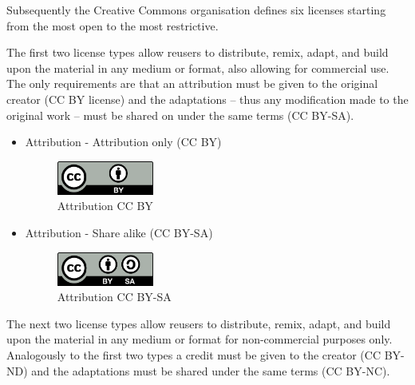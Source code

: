 Subsequently the Creative Commons organisation defines six licenses starting from the most open to the most restrictive.

The first two license types allow reusers to distribute, remix, adapt, and build upon the material in any medium or format, also allowing for commercial use. The only requirements are that an attribution must be given to the original creator (CC BY license) and the adaptations – thus any modification made to the original work – must be shared on under the same terms (CC BY-SA).

\begin{itemize}
  \item Attribution - Attribution only (CC BY)
    \begin{figure}[H]
    \centering
    \includegraphics[width=0.3\textwidth]{images/by.png}
    \caption{Attribution CC BY}
    \label{fig:ccBY}
    \end{figure}
    
    \item Attribution - Share alike (CC BY-SA)
    
    \begin{figure}[H]
    \centering
    \includegraphics[width=0.3\textwidth]{images/by-sa.png}
    \caption{Attribution CC BY-SA}
    \label{fig:ccBYSA}
    \end{figure}
 \end{itemize}
 
The next two license types allow reusers to distribute, remix, adapt, and build upon the material in any medium or format for non-commercial purposes only. Analogously to the first two types a credit must be given to the creator (CC BY-ND) and the adaptations must be shared under the same terms (CC BY-NC).

